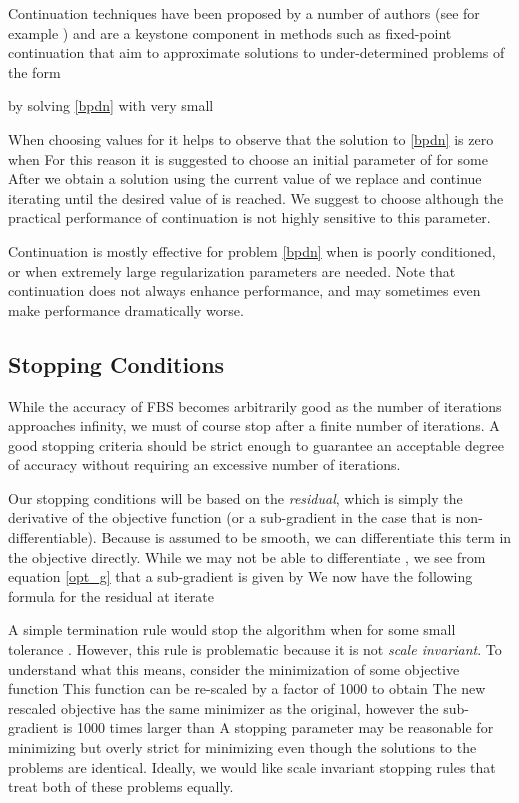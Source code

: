 \documentclass{amsart}
\newcommand{\eqn}[2]{}
\newcommand{\st}{\hbox{ \,\,subject to\,\, }}
\newcommand{\kp}{^{k+1}}
\DeclareMathOperator*{\minimize}{minimize\quad}
\theoremstyle{definition}
\begin{document}
    Continuation techniques have been proposed by a number of authors (see for example \cite{FNW07,BBC09}) and are a keystone component in methods such as fixed-point continuation \cite{HYY07} that aim to approximate solutions to under-determined problems of the form 
      \eqn{bpdn_eq}{
 \minimize  \mu \|x\|_1 \st    Ax-b = 0
}
by solving \eqref{bpdn} with very small 
     
     When choosing values for  it helps to observe that the solution to \eqref{bpdn} is zero when   For this reason it is suggested to choose an initial parameter of  for some   After we obtain a solution using the current value of  we replace  and continue iterating until the desired value of  is reached.  We suggest to choose  although the practical performance of continuation is not highly sensitive to this parameter. 
     
     Continuation is mostly effective for problem \eqref{bpdn} when  is poorly conditioned, or when extremely large regularization parameters are needed.  Note that continuation does not always enhance performance, and may sometimes even make performance dramatically worse.  
    

\subsection{Stopping Conditions}\label{sec:stop}
While the accuracy of FBS becomes arbitrarily good as the number of iterations approaches infinity, we must of course stop after a finite number of iterations.  A good stopping criteria should be strict enough to guarantee an acceptable degree of accuracy without requiring an excessive number of iterations.  

Our stopping conditions will be based on the {\em residual}, which is simply the derivative of the objective function (or a sub-gradient in the case that  is non-differentiable).  Because  is assumed to be smooth, we can differentiate this term in the objective directly.  While we may not be able to differentiate , we see from equation \eqref{opt_g} that a sub-gradient is given by   We now have the following formula for the residual  at iterate 
  \eqn{resid}{r\kp = \nabla f(x\kp)+\frac{ \hat x^{k+1}-x\kp}{\tau^k}.}

A simple termination rule would stop the algorithm when  for some small tolerance .  However, this rule is problematic because it is not {\em scale invariant}.   To understand what this means, consider the minimization of some objective function   This function can be re-scaled by a factor of 1000 to obtain   The new rescaled objective has the same minimizer as the original, however the sub-gradient  is 1000 times larger than   A stopping parameter  may be reasonable for minimizing  but overly strict for minimizing  even though the solutions to the problems are identical.   Ideally, we would like scale invariant stopping rules that treat both of these problems equally.
\end{document}
